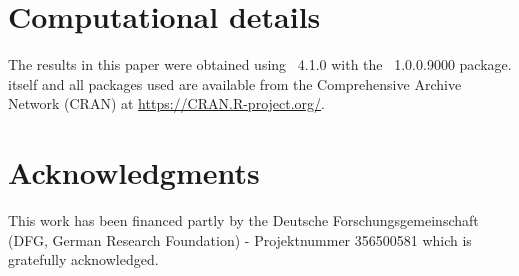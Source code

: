 \documentclass[article]{jss}
\begin{document}
%
%

\section*{Computational details}

The results in this paper were obtained using
~4.1.0 with the
~1.0.0.9000 package.  itself
and all packages used are available from the Comprehensive
 Archive Network (CRAN) at \url{https://CRAN.R-project.org/}.


\section*{Acknowledgments}

This work has been financed partly by the Deutsche Forschungsgemeinschaft (DFG, German Research Foundation) - Projektnummer 356500581 which is gratefully acknowledged.


\end{document}
